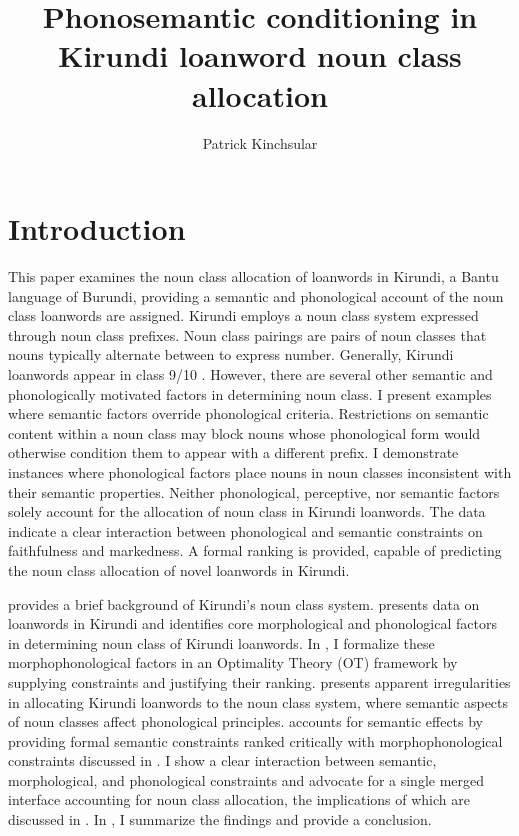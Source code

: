 \documentclass[output=paper,colorlinks,citecolor=brown,
]{langscibook}
\author{Patrick Kinchsular\affiliation{New York University}}
\title{Phonosemantic conditioning in Kirundi loanword noun class allocation}
\begin{document}
\maketitle

\section{Introduction}
\label{sec:kinchsular:intro}

This paper examines the noun class allocation of loanwords in Kirundi, a Bantu language of Burundi, providing a semantic and phonological account of the noun class loanwords are assigned. Kirundi employs a noun class system expressed through noun class prefixes. Noun class pairings are pairs of noun classes that nouns typically alternate between to express number. Generally, Kirundi loanwords appear in class 9/10 \citep{zorc2007kinyarwanda, niyondagara1993kirundi, niyonkuru}. However, there are several other semantic and phonologically motivated factors in determining noun class. I present examples where semantic factors override phonological criteria. Restrictions on semantic content within a noun class may block nouns whose phonological form would otherwise condition them to appear with a different prefix. I demonstrate instances where phonological factors place nouns in noun classes inconsistent with their semantic properties. Neither phonological, perceptive, nor semantic factors solely account for the allocation of noun class in Kirundi loanwords. The data indicate a clear interaction between phonological and semantic constraints on faithfulness and markedness. A formal ranking is provided, capable of predicting the noun class allocation of novel loanwords in Kirundi.

 provides a brief background of Kirundi's noun class system.  presents data on loanwords in Kirundi and identifies core morphological and phonological factors in determining noun class of Kirundi loanwords. In , I formalize these morphophonological factors in an Optimality Theory (OT) framework by supplying constraints and justifying their ranking.  presents apparent irregularities in allocating Kirundi loanwords to the noun class system, where semantic aspects of noun classes affect phonological principles.  accounts for semantic effects by providing formal semantic constraints ranked critically with morphophonological constraints discussed in . I show a clear interaction between semantic, morphological, and phonological constraints and advocate for a single merged interface accounting for noun class allocation, the implications of which are discussed in . In , I summarize the findings and provide a conclusion.
\end{document}
